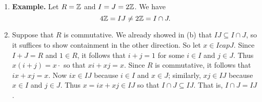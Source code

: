 \begin{enumerate}
\begin{enumerate}
               \begin{itemize}
                  \item \textbf{closure under subtraction.} Since $I$ is
                        closed under additive inverses, we have that
                        $-i_k' \in I$ for $1 \le k \le m$. It follows that
                        $$a - b = i_1j_1 + \cdots + i_nj_n +
                          (-i_1')j_1' + \cdots + (-i_m')j_m' \in IJ$$
                        by the definition of $IJ$. Thus $IJ$ is closed under
                        subtraction.
                  \item \textbf{closure under multiplication by $R$.} Let
                        $r \in R$. Since $I$ is closed under left multiplication
                        and $J$ is closed under right multiplication by $R$, it
                        follows that
                        $$ra = (ri_1)j_1 + \cdots + (ri_n)j_n \in IJ
                          \text{ and } ar = i_1(j_1r) + \cdots +
                          i_n(j_nr) \in IJ,$$
                        so that $IJ$ is closed under multiplication by $R$.
               \end{itemize}
               Thus $IJ$ is an ideal of $R$. Now since $I$ is closed under
               addition and right multiplication by $R$, it follows that
               $a \in I$; similarly, $a \in J$ because $J$ is closed under
               addition and left multiplication by $R$. Thus $a \in I \cap J$,
               and we conclude that $IJ \subseteq I \cap J$. \qed
         \item \textbf{Example.} Let $R = \mathbb{Z}$ and $I = J = 2\mathbb{Z}$. We have
               $$4\mathbb{Z} = IJ \neq 2\mathbb{Z} = I \cap J.$$
         \item Suppose that $R$ is commutative. We already showed in (b) that
               $IJ \subseteq I \cap J$, so it suffices to show containment in
               the other direction. So let $x \in I cap J$. Since $I + J = R$
               and $1 \in R$, it follows that $i + j = 1$ for some $i \in I$ and
               $j \in J$. Thus $x(i + j) = x \cdot $ so that $xi + xj = x$.
               Since $R$ is commutative, it follows that $ix + xj = x$. Now
               $ix \in IJ$ because $i \in I$ and $x \in J$; similarly,
               $xj \in IJ$ because $x \in I$ and $j \in J$. Thus
               $x = ix + xj \in IJ$ so that $I \cap J \subseteq IJ$. That is,
               $I \cap J = IJ$.


\end{enumerate}
\end{enumerate}
